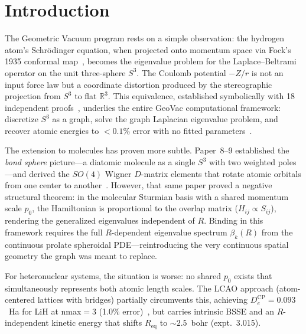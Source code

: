 \documentclass[aps,pra,twocolumn,superscriptaddress,longbibliography]{revtex4-2}
\begin{document}
\maketitle


\section{Introduction}
\label{sec:intro}

The Geometric Vacuum program rests on a simple observation: the
hydrogen atom's Schr\"odinger equation, when projected onto momentum
space via Fock's 1935 conformal map~\cite{Fock1935}, becomes the
eigenvalue problem for the Laplace--Beltrami operator on the unit
three-sphere $S^3$.  The Coulomb potential $-Z/r$ is not an input
force law but a coordinate distortion produced by the stereographic
projection from $S^3$ to flat $\mathbb{R}^3$.  This equivalence,
established symbolically with 18 independent proofs~\cite{loutey_paper7},
underlies the entire GeoVac computational framework: discretize $S^3$
as a graph, solve the graph Laplacian eigenvalue problem, and recover
atomic energies to $<0.1\%$ error with no fitted
parameters~\cite{loutey_paper0, loutey_paper1}.

The extension to molecules has proven more subtle.  Paper~8--9
established the \emph{bond sphere} picture---a diatomic molecule
as a single $S^3$ with two weighted poles---and derived the $SO(4)$
Wigner $D$-matrix elements that rotate atomic orbitals from one
center to another~\cite{loutey_paper8}.  However, that same paper
proved a negative structural theorem: in the molecular Sturmian basis
with a shared momentum scale $p_0$, the Hamiltonian is proportional
to the overlap matrix ($H_{ij} \propto S_{ij}$), rendering the
generalized eigenvalues independent of $R$.  Binding in this
framework requires the full $R$-dependent eigenvalue spectrum
$\beta_k(R)$ from the continuous prolate spheroidal PDE---reintroducing
the very continuous spatial geometry the graph was meant to replace.

For heteronuclear systems, the situation is worse: no shared $p_0$
exists that simultaneously represents both atomic length scales.
The LCAO approach (atom-centered lattices with bridges) partially
circumvents this, achieving $D_e^{\text{CP}} = 0.093$~Ha for LiH
at nmax$= 3$ (1.0\% error)~\cite{loutey_lcao_fci}, but carries
intrinsic BSSE and an $R$-independent kinetic energy that shifts
$R_{\mathrm{eq}}$ to $\sim 2.5$~bohr (expt.\ 3.015).
\end{document}
